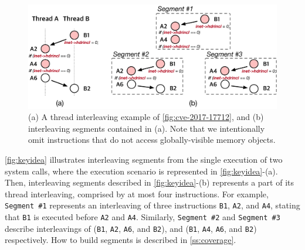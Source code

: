 %
\begin{figure}[t]
  \centering
  \includegraphics[width=0.99\linewidth]{fig/intuition.pdf}
  \caption{(a) A thread interleaving example of
    \autoref{fig:cve-2017-17712}, and (b) interleaving segments
    contained in (a).  Note that we intentionally omit instructions
    that do not access globally-visible memory objects.}
  \label{fig:keyidea}
\end{figure}
%
\autoref{fig:keyidea} illustrates interleaving segments from the
single execution of two system calls, where the execution scenario is
represented in \autoref{fig:keyidea}-(a).
%
Then, interleaving segments described in \autoref{fig:keyidea}-(b)
represents a part of its thread interleaving, comprised by at most
four instructions.
%
For example, \texttt{Segment \#1} represents an interleaving of three
instructions \texttt{B1}, \texttt{A2}, and \texttt{A4}, stating that
\texttt{B1} is executed before \texttt{A2} and \texttt{A4}.
%
Similarly, \texttt{Segment \#2} and \texttt{Segment \#3} describe
interleavings of (\texttt{B1}, \texttt{A2}, \texttt{A6}, and
\texttt{B2}), and (\texttt{B1}, \texttt{A4}, \texttt{A6}, and
\texttt{B2}) respectively.
How to build segments is described in \autoref{ss:coverage}.

%
%
%


